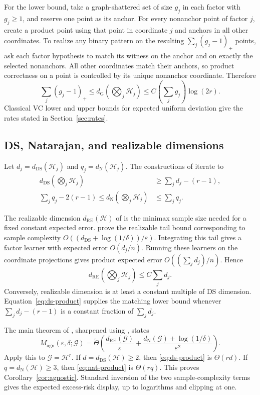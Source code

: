 \documentclass{article}
\theoremstyle{definition}
\theoremstyle{remark}
\newcommand{\cH}{\mathcal H}
\newcommand{\cG}{\mathcal G}
\newcommand{\Nat}{d_{\mathrm N}}
\newcommand{\DS}{d_{\mathrm{DS}}}
\newcommand{\Gdim}{d_{\mathrm G}}
\newcommand{\1}{\mathbf 1}
\begin{document}
For the lower bound, take a graph-shattered set of size \(g_j\) in each factor with \(g_j\ge1\), and reserve one point as its anchor. For every nonanchor point of factor \(j\), create a product point using that point in coordinate \(j\) and anchors in all other coordinates. To realize any binary pattern on the resulting \(\sum_j(g_j-1)_+\) points, ask each factor hypothesis to match its witness on the anchor and on exactly the selected nonanchors. All other coordinates match their anchors, so product correctness on a point is controlled by its unique nonanchor coordinate. Therefore \[ \sum_j(g_j-1)_+ \le\Gdim\!\left(\bigotimes_j\cH_j\right) \le C\left(\sum_jg_j\right)\log(2r). \] Classical VC lower and upper bounds for expected uniform deviation give the rates stated in Section~\ref{sec:rates}.

\subsection{DS, Natarajan, and realizable dimensions}

Let \(d_j=\DS(\cH_j)\) and \(q_j=\Nat(\cH_j)\). The constructions of \citet{hanneke2024direct} iterate to
\begin{align}
\DS\!\left(\bigotimes_j\cH_j\right)&\ge\sum_jd_j-(r-1),
\label{eq:ds-product}\\
\sum_jq_j-2(r-1)
\le\Nat\!\left(\bigotimes_j\cH_j\right)&\le\sum_jq_j.
\label{eq:nat-product}
\end{align}

The realizable dimension \(d_{\mathrm{RE}}(\cH)\) of \citet{cohen2025natarajan} is the minimax sample size needed for a fixed constant expected error. \citet{pabbaraju2026optimal} prove the realizable tail bound corresponding to sample complexity \(O((\DS+\log(1/\delta))/\varepsilon)\). Integrating this tail gives a factor learner with expected error \(O(d_j/n)\). Running these learners on the coordinate projections gives product expected error \(O((\sum_jd_j)/n)\). Hence \[ d_{\mathrm{RE}}\!\left(\bigotimes_j\cH_j\right) \le C\sum_jd_j. \] Conversely, realizable dimension is at least a constant multiple of DS dimension. Equation~\eqref{eq:ds-product} supplies the matching lower bound whenever \(\sum_jd_j-(r-1)\) is a constant fraction of \(\sum_jd_j\).

The main theorem of \citet{cohen2025natarajan}, sharpened using \citet{pabbaraju2026optimal}, states \[ M_{\mathrm{agn}}(\varepsilon,\delta;\cG) =\widetilde\Theta\left( \frac{d_{\mathrm{RE}}(\cG)}{\varepsilon} +\frac{\Nat(\cG)+\log(1/\delta)}{\varepsilon^2} \right). \] Apply this to \(\cG=\cH^r\). If \(d=\DS(\cH)\ge2\), then \eqref{eq:ds-product} is \(\Theta(rd)\). If \(q=\Nat(\cH)\ge3\), then \eqref{eq:nat-product} is \(\Theta(rq)\). This proves Corollary~\ref{cor:agnostic}. Standard inversion of the two sample-complexity terms gives the expected excess-risk display, up to logarithms and clipping at one.
\end{document}

